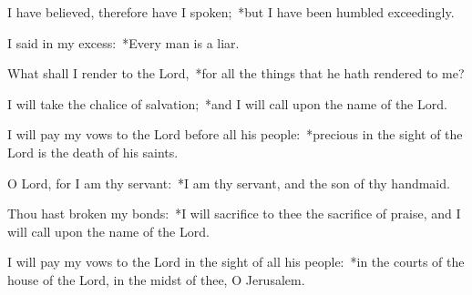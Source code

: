 \begin{enpars}
\item I have believed, therefore have I spoken;~*but I have been humbled exceedingly.
\item I said in my excess:~*Every man is a liar.
\item What shall I render to the Lord,~*for all the things that he hath rendered to me?
\item I will take the chalice of salvation;~*and I will call upon the name of the Lord.
\item I will pay my vows to the Lord before all his people:~*precious in the sight of the Lord is the death of his saints.
\item O Lord, for I am thy servant:~*I am thy servant, and the son of thy handmaid.
\item Thou hast broken my bonds:~*I will sacrifice to thee the sacrifice of praise, and I will call upon the name of the Lord.
\item I will pay my vows to the Lord in the sight of all his people:~*in the courts of the house of the Lord, in the midst of thee, O Jerusalem.
\end{enpars}

